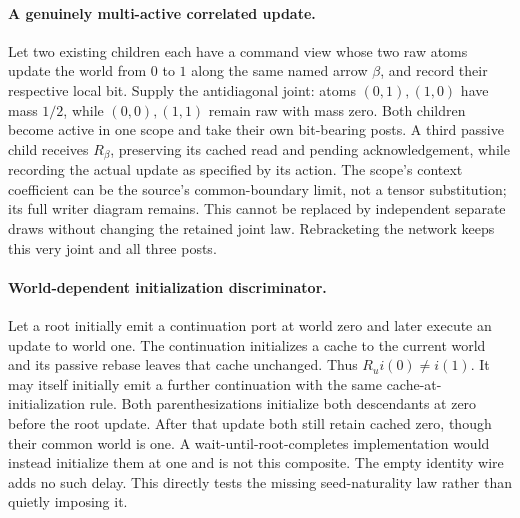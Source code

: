 \documentclass[11pt]{article}
\begin{document}
\paragraph{A genuinely multi-active correlated update.}
Let two existing children each have a command view whose two raw atoms update the world from $0$ to $1$ along the same named arrow $\beta$, and record their respective local bit. Supply the antidiagonal joint: atoms $(0,1),(1,0)$ have mass $1/2$, while $(0,0),(1,1)$ remain raw with mass zero. Both children become active in one scope and take their own bit-bearing posts. A third passive child receives $R_\beta$, preserving its cached read and pending acknowledgement, while recording the actual update as specified by its action. The scope's context coefficient can be the source's common-boundary limit, not a tensor substitution; its full writer diagram remains. This cannot be replaced by independent separate draws without changing the retained joint law. Rebracketing the network keeps this very joint and all three posts.

\paragraph{World-dependent initialization discriminator.}
Let a root initially emit a continuation port at world zero and later execute an update to world one. The continuation initializes a cache to the current world and its passive rebase leaves that cache unchanged. Thus $R_ui(0)\ne i(1)$. It may itself initially emit a further continuation with the same cache-at-initialization rule. Both parenthesizations initialize both descendants at zero before the root update. After that update both still retain cached zero, though their common world is one. A wait-until-root-completes implementation would instead initialize them at one and is not this composite. The empty identity wire adds no such delay. This directly tests the missing seed-naturality law rather than quietly imposing it.
\end{document}
